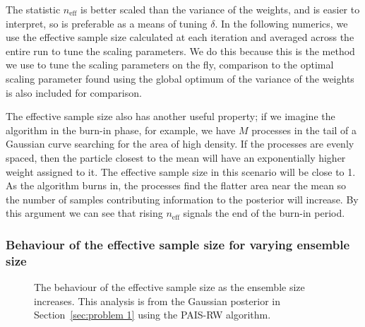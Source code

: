 \documentclass[final]{siamltex}
\newcommand{\neff}{n_{\text{eff}}}
\begin{document}
The statistic $\neff$ is better scaled than the variance of the weights, and is easier to interpret, so is preferable as a means of tuning $\delta$. In the following numerics, we use the effective sample size calculated at each iteration and averaged across the entire run to tune the scaling parameters. We do this because this is the method we use to tune the scaling parameters on the fly, comparison to the optimal scaling parameter found using the global optimum of the variance of the weights is also included for comparison.

The effective sample size also has another useful property; if we imagine the algorithm in the burn-in phase, for example, we have $M$ processes in the tail of a Gaussian curve searching for the area of high density. If the processes are evenly spaced, then the particle closest to the mean will have an exponentially higher weight assigned to it. The effective sample size in this scenario will be close to 1. As the algorithm burns in, the processes find the flatter area near the mean so the number of samples contributing information to the posterior will increase. By this argument we can see that rising $\neff$ signals the end of the burn-in period.

\subsubsection{Behaviour of the effective sample size for varying ensemble size}

\begin{figure}[htb]
\centering
{}
\caption{The behaviour of the effective sample size as the ensemble size increases. This analysis is from the Gaussian posterior in Section~\ref{sec:problem 1} using the PAIS-RW algorithm.}
\label{fig:neff-M}
\end{figure}
\end{document}
